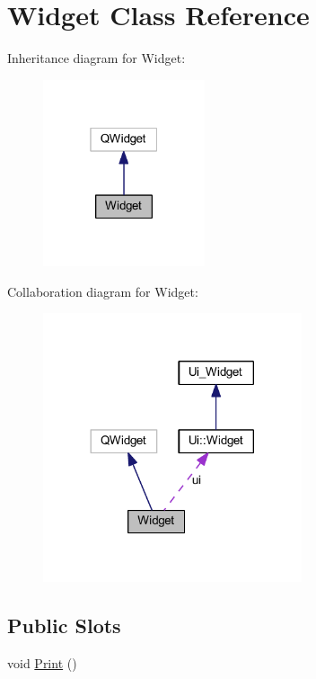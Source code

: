 \hypertarget{class_widget}{}\section{Widget Class Reference}
\label{class_widget}


Inheritance diagram for Widget\+:\nopagebreak
\begin{figure}[H]
\begin{center}
\leavevmode
\includegraphics[width=135pt]{class_widget__inherit__graph}
\end{center}
\end{figure}


Collaboration diagram for Widget\+:
\nopagebreak
\begin{figure}[H]
\begin{center}
\leavevmode
\includegraphics[width=216pt]{class_widget__coll__graph}
\end{center}
\end{figure}
\subsection*{Public Slots}
\begin{DoxyCompactItemize}
\item 
void \hyperlink{class_widget_adafcde4720aa7cb21f5d8966ae03c08c}{Print} ()
\end{DoxyCompactItemize}
